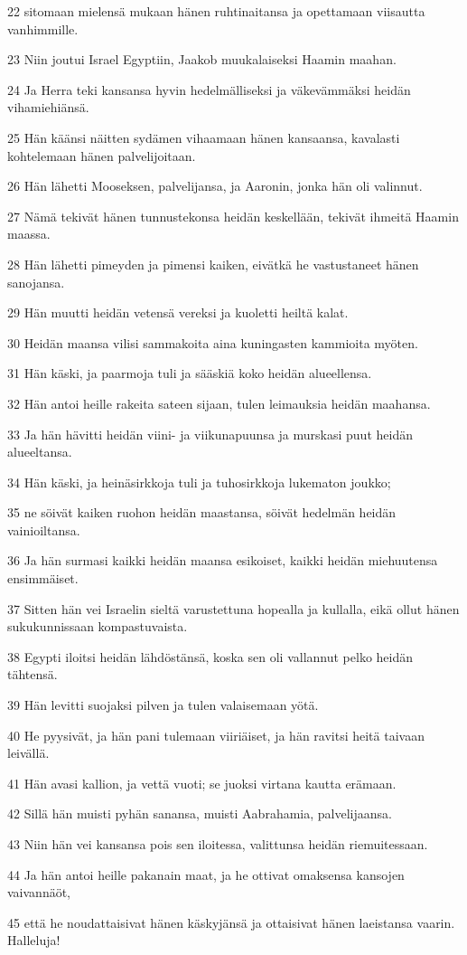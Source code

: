 \par 22 sitomaan mielensä mukaan hänen ruhtinaitansa ja opettamaan viisautta vanhimmille.
\par 23 Niin joutui Israel Egyptiin, Jaakob muukalaiseksi Haamin maahan.
\par 24 Ja Herra teki kansansa hyvin hedelmälliseksi ja väkevämmäksi heidän vihamiehiänsä.
\par 25 Hän käänsi näitten sydämen vihaamaan hänen kansaansa, kavalasti kohtelemaan hänen palvelijoitaan.
\par 26 Hän lähetti Mooseksen, palvelijansa, ja Aaronin, jonka hän oli valinnut.
\par 27 Nämä tekivät hänen tunnustekonsa heidän keskellään, tekivät ihmeitä Haamin maassa.
\par 28 Hän lähetti pimeyden ja pimensi kaiken, eivätkä he vastustaneet hänen sanojansa.
\par 29 Hän muutti heidän vetensä vereksi ja kuoletti heiltä kalat.
\par 30 Heidän maansa vilisi sammakoita aina kuningasten kammioita myöten.
\par 31 Hän käski, ja paarmoja tuli ja sääskiä koko heidän alueellensa.
\par 32 Hän antoi heille rakeita sateen sijaan, tulen leimauksia heidän maahansa.
\par 33 Ja hän hävitti heidän viini- ja viikunapuunsa ja murskasi puut heidän alueeltansa.
\par 34 Hän käski, ja heinäsirkkoja tuli ja tuhosirkkoja lukematon joukko;
\par 35 ne söivät kaiken ruohon heidän maastansa, söivät hedelmän heidän vainioiltansa.
\par 36 Ja hän surmasi kaikki heidän maansa esikoiset, kaikki heidän miehuutensa ensimmäiset.
\par 37 Sitten hän vei Israelin sieltä varustettuna hopealla ja kullalla, eikä ollut hänen sukukunnissaan kompastuvaista.
\par 38 Egypti iloitsi heidän lähdöstänsä, koska sen oli vallannut pelko heidän tähtensä.
\par 39 Hän levitti suojaksi pilven ja tulen valaisemaan yötä.
\par 40 He pyysivät, ja hän pani tulemaan viiriäiset, ja hän ravitsi heitä taivaan leivällä.
\par 41 Hän avasi kallion, ja vettä vuoti; se juoksi virtana kautta erämaan.
\par 42 Sillä hän muisti pyhän sanansa, muisti Aabrahamia, palvelijaansa.
\par 43 Niin hän vei kansansa pois sen iloitessa, valittunsa heidän riemuitessaan.
\par 44 Ja hän antoi heille pakanain maat, ja he ottivat omaksensa kansojen vaivannäöt,
\par 45 että he noudattaisivat hänen käskyjänsä ja ottaisivat hänen laeistansa vaarin. Halleluja!

